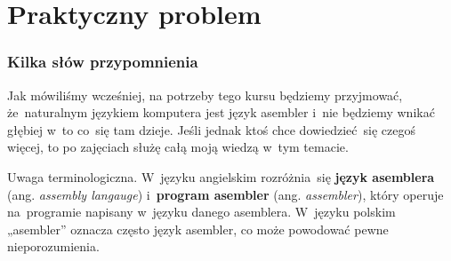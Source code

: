 \documentclass[10pt,t]{beamer}
\begin{document}










\section{Praktyczny problem}



\begin{frame}
  \frametitle{Kilka słów przypomnienia}


  Jak mówiliśmy wcześniej, na potrzeby tego kursu będziemy przyjmować,
  że~naturalnym językiem komputera jest język asembler i~nie będziemy
  wnikać głębiej w~to co~się tam dzieje. Jeśli jednak ktoś chce
  dowiedzieć~się czegoś więcej, to po zajęciach służę całą moją wiedzą w~tym
  temacie.

  \alert{Uwaga terminologiczna.} W~języku angielskim rozróżnia~się
  \textbf{język asemblera} (ang. \textit{assembly langauge})
  i~\textbf{program asembler} (ang. \textit{assembler}), który operuje
  na~programie napisany w~języku danego asemblera. W~języku polskim
  „asembler” oznacza często język asembler, co może powodować pewne
  nieporozumienia.

\end{frame}
\end{document}
